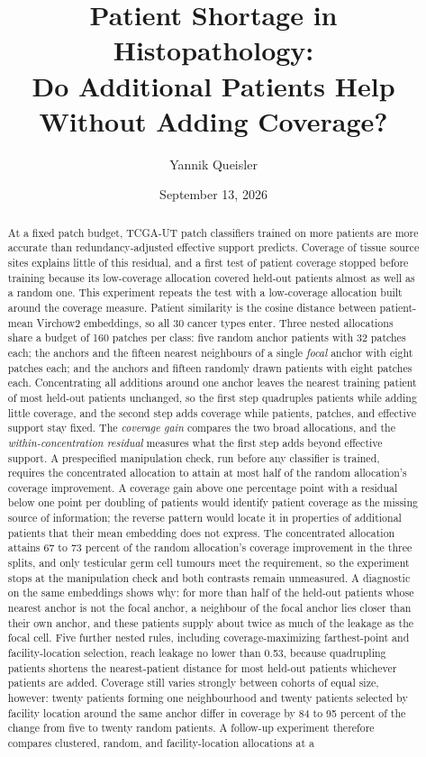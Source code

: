 \documentclass[11pt]{article}
\title{Patient Shortage in Histopathology:\\Do Additional Patients Help\\Without Adding Coverage?}
\author{Yannik Queisler}
\date{September 13, 2026}
\begin{document}
\raggedbottom
{}
\setlength{\emergencystretch}{2em}
\maketitle
\begin{abstract}
\noindent At a fixed patch budget, TCGA-UT patch classifiers trained on more patients are more accurate than redundancy-adjusted effective support predicts. Coverage of tissue source sites explains little of this residual, and a first test of patient coverage stopped before training because its low-coverage allocation covered held-out patients almost as well as a random one. This experiment repeats the test with a low-coverage allocation built around the coverage measure. Patient similarity is the cosine distance between patient-mean Virchow2 embeddings, so all 30 cancer types enter. Three nested allocations share a budget of 160 patches per class: five random anchor patients with 32 patches each; the anchors and the fifteen nearest neighbours of a single \emph{focal} anchor with eight patches each; and the anchors and fifteen randomly drawn patients with eight patches each. Concentrating all additions around one anchor leaves the nearest training patient of most held-out patients unchanged, so the first step quadruples patients while adding little coverage, and the second step adds coverage while patients, patches, and effective support stay fixed. The \emph{coverage gain} compares the two broad allocations, and the \emph{within-concentration residual} measures what the first step adds beyond effective support. A prespecified manipulation check, run before any classifier is trained, requires the concentrated allocation to attain at most half of the random allocation's coverage improvement. A coverage gain above one percentage point with a residual below one point per doubling of patients would identify patient coverage as the missing source of information; the reverse pattern would locate it in properties of additional patients that their mean embedding does not express. The concentrated allocation attains 67 to 73 percent of the random allocation's coverage improvement in the three splits, and only testicular germ cell tumours meet the requirement, so the experiment stops at the manipulation check and both contrasts remain unmeasured. A diagnostic on the same embeddings shows why: for more than half of the held-out patients whose nearest anchor is not the focal anchor, a neighbour of the focal anchor lies closer than their own anchor, and these patients supply about twice as much of the leakage as the focal cell. Five further nested rules, including coverage-maximizing farthest-point and facility-location selection, reach leakage no lower than 0.53, because quadrupling patients shortens the nearest-patient distance for most held-out patients whichever patients are added. Coverage still varies strongly between cohorts of equal size, however: twenty patients forming one neighbourhood and twenty patients selected by facility location around the same anchor differ in coverage by 84 to 95 percent of the change from five to twenty random patients. A follow-up experiment therefore compares clustered, random, and facility-location allocations at a 
\end{abstract}
\end{document}
